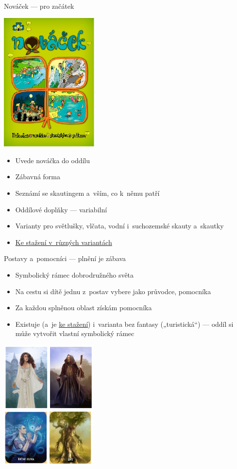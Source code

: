 \documentclass[hyperref={bookmarks=true, unicode=true, colorlinks=true, plainpages=false, pdfkeywords={Skaut, Junak, Skauting, Vychovna metoda}, linkcolor=OrangeRed, anchorcolor=OrangeRed, citecolor=RawSienna, filecolor=RawSienna, menucolor=OrangeRed, urlcolor=RawSienna, pdftex}, compress, xelatex, xcolor=dvipsnames, print]{beamer}
\begin{document}
\begin{frame}{Nováček --- pro začátek}
\begin{multicols}{2}
\includegraphics[height=7cm]{novacek.png}
\columnbreak
\begin{itemize}
\item Uvede nováčka do oddílu
\item Zábavná forma
\item Seznámí se skautingem a~vším, co k~němu patří
\item Oddílové doplňky --- variabilní
\item Varianty pro světlušky, vlčata, vodní i~suchozemské skauty a~skautky
\item \href{http://krizovatka.skaut.cz/oddil/program/skauti-skautky/skauti-skautky-stezky/novacek}{Ke stažení v~různých variantách}
\end{itemize}
\end{multicols}
\end{frame}

\begin{frame}{Postavy a~pomocníci --- plnění je zábava}
\begin{multicols}{2}
\begin{itemize}
\item Symbolický rámec dobrodružného světa
\item Na cestu si dítě jednu z~postav vybere jako průvodce, pomocníka
\item Za každou splněnou oblast získám pomocníka
\item Existuje (a~je \href{http://krizovatka.skaut.cz/oddil/program/skauti-skautky/skauti-skautky-stezky/skauti-skautky-stezky-stezky}{ke stažení}) i~varianta bez fantasy („turistická“) --- oddíl si může vytvořit vlastní symbolický rámec
\end{itemize}
\columnbreak
\includegraphics[height=6.5cm]{postavy.png}
\end{multicols}
\end{frame}
\end{document}
